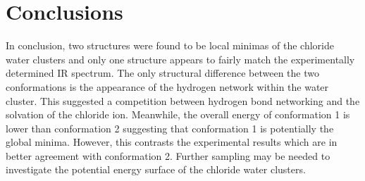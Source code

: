 \documentclass[11pt]{article}
\begin{document}
\section{Conclusions}

In conclusion, two structures were found to be local minimas of the chloride
water clusters and only one structure appears to fairly match the experimentally
determined IR spectrum. The only structural difference between the two conformations
is the appearance of the hydrogen network within the water cluster. This suggested
a competition between hydrogen bond networking and the solvation of the
chloride ion. Meanwhile, the overall energy of conformation 1 is lower than
conformation 2 suggesting that conformation 1 is potentially the global
minima. However, this contrasts the experimental results which are in better
agreement with conformation 2. Further sampling may be needed to investigate
the potential energy surface of the chloride water clusters.

\printbibliography
\end{document}
